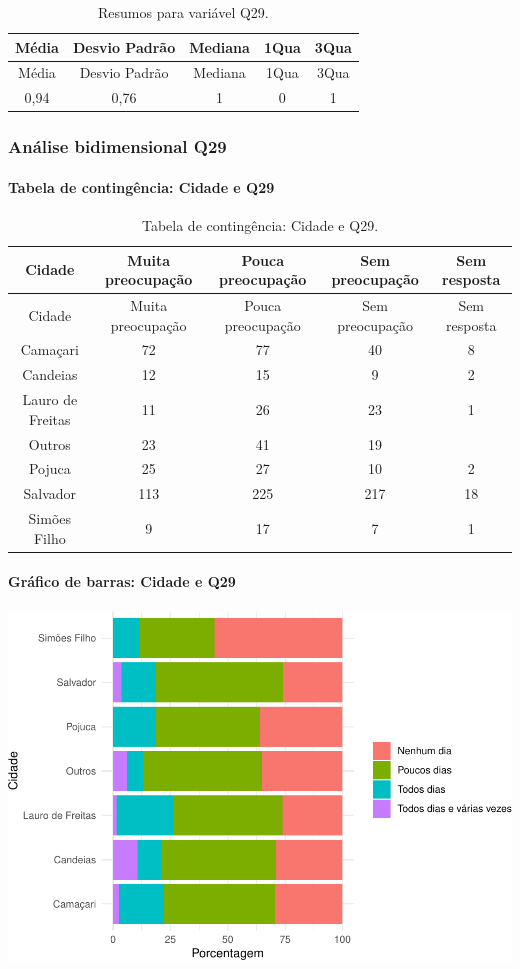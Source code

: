 \documentclass[]{article}
\let\oldparagraph\paragraph
\renewcommand{\paragraph}[1]{\oldparagraph{#1}\mbox{}}
\begin{document}
\begin{longtable}[]{@{}ccccc@{}}
\caption{\label{tab:unnamed-chunk-896}Resumos para variável Q29.}\tabularnewline
\toprule
Média & Desvio Padrão & Mediana & 1Qua & 3Qua\tabularnewline
\midrule
\endfirsthead
\toprule
Média & Desvio Padrão & Mediana & 1Qua & 3Qua\tabularnewline
\midrule
\endhead
0,94 & 0,76 & 1 & 0 & 1\tabularnewline
\bottomrule
\end{longtable}

\cleardoublepage

\hypertarget{anuxe1lise-bidimensional-q29}{%
\subsubsection{Análise bidimensional Q29}\label{anuxe1lise-bidimensional-q29}}

\hypertarget{tabela-de-continguxeancia-cidade-e-q29}{%
\paragraph{Tabela de contingência: Cidade e Q29}\label{tabela-de-continguxeancia-cidade-e-q29}}

\begin{longtable}[]{@{}ccccc@{}}
\caption{\label{tab:unnamed-chunk-897}Tabela de contingência: Cidade e Q29.}\tabularnewline
\toprule
Cidade & Muita preocupação & Pouca preocupação & Sem preocupação & Sem resposta\tabularnewline
\midrule
\endfirsthead
\toprule
Cidade & Muita preocupação & Pouca preocupação & Sem preocupação & Sem resposta\tabularnewline
\midrule
\endhead
Camaçari & 72 & 77 & 40 & 8\tabularnewline
Candeias & 12 & 15 & 9 & 2\tabularnewline
Lauro de Freitas & 11 & 26 & 23 & 1\tabularnewline
Outros & 23 & 41 & 19 &\tabularnewline
Pojuca & 25 & 27 & 10 & 2\tabularnewline
Salvador & 113 & 225 & 217 & 18\tabularnewline
Simões Filho & 9 & 17 & 7 & 1\tabularnewline
\bottomrule
\end{longtable}

\hypertarget{gruxe1fico-de-barras-cidade-e-q29}{%
\paragraph{Gráfico de barras: Cidade e Q29}\label{gruxe1fico-de-barras-cidade-e-q29}}

\begin{center}\includegraphics[width=0.75\linewidth]{relatorio_covid19_files/figure-latex/unnamed-chunk-898-1} \end{center}
\end{document}

